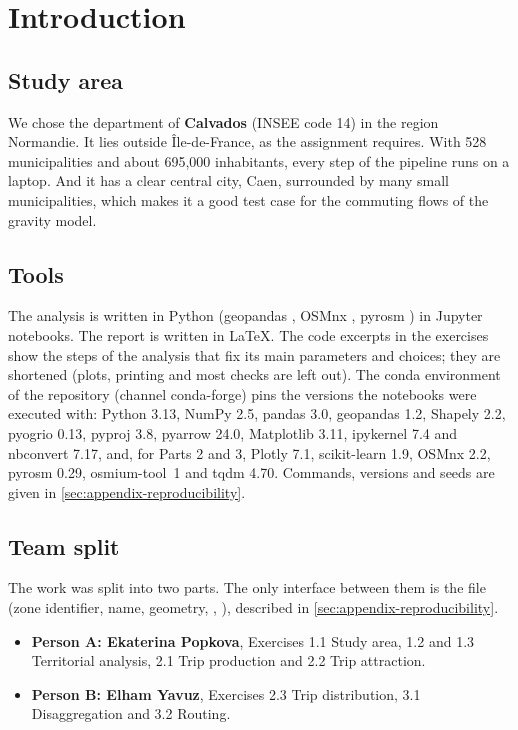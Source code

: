 \section{Introduction}\label{sec:introduction}

\subsection{Study area}
We chose the department of \textbf{Calvados} (INSEE code 14) in the region Normandie. It lies outside
\^Ile-de-France, as the assignment requires. With 528 municipalities and about 695{,}000 inhabitants, every step of
the pipeline runs on a laptop. And it has a clear central city, Caen, surrounded by many small municipalities, which
makes it a good test case for the commuting flows of the gravity model.

\subsection{Tools}
The analysis is written in Python (geopandas \cite{geopandas}, OSMnx \cite{osmnx}, pyrosm \cite{pyrosm}) in Jupyter
notebooks. The report is written in \LaTeX{}. The code excerpts in the exercises show the steps of the analysis
that fix its main parameters and choices; they are shortened (plots, printing and most checks are left out).
The conda environment  of the repository (channel conda-forge) pins the versions the notebooks
were executed with: Python 3.13, NumPy 2.5, pandas 3.0, geopandas 1.2, Shapely 2.2, pyogrio 0.13, pyproj 3.8,
pyarrow 24.0, Matplotlib 3.11, ipykernel 7.4 and nbconvert 7.17, and, for Parts 2 and 3, Plotly 7.1,
scikit-learn 1.9, OSMnx 2.2, pyrosm 0.29, osmium-tool~1 and tqdm 4.70. Commands, versions and seeds are given in
\cref{sec:appendix-reproducibility}.

\subsection{Team split}
The work was split into two parts. The only interface between them is the file 
(zone identifier, name, geometry, \Oprime{}, \Dj{}), described in \cref{sec:appendix-reproducibility}.
\begin{itemize}
  \item \textbf{Person A: Ekaterina Popkova}, Exercises 1.1 Study area, 1.2 and 1.3 Territorial analysis, 2.1 Trip
  production and 2.2 Trip attraction.
  \item \textbf{Person B: Elham Yavuz}, Exercises 2.3 Trip distribution, 3.1 Disaggregation and 3.2 Routing.
\end{itemize}
